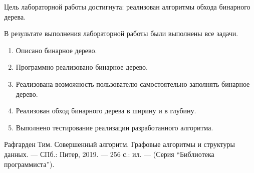 \documentclass[12pt, a4paper]{article}
\begin{document}
Цель лабораторной работы достигнута: реализован алгоритмы обхода бинарного дерева.

В результате выполнения лабораторной работы были выполнены все задачи.
\begin{enumerate}
\item Описано бинарное дерево.
\item Программно реализовано бинарное дерево.
\item Реализована возможность пользователю самостоятельно заполнять бинарное дерево.
\item Реализован обход бинарного дерева в ширину и в глубину.
\item Выполнено тестирование реализации разработанного алгоритма.
\end{enumerate}

\newpage
\begin{center}
\begin{thebibliography}{}
 Рафгарден Тим. Совершенный алгоритм. Графовые алгоритмы и структуры данных. --- СПб.: Питер, 2019. --- 256 с.: ил. --- (Серия ``Библиотека программиста'').
\end{thebibliography}
\end{center}
\end{document}
